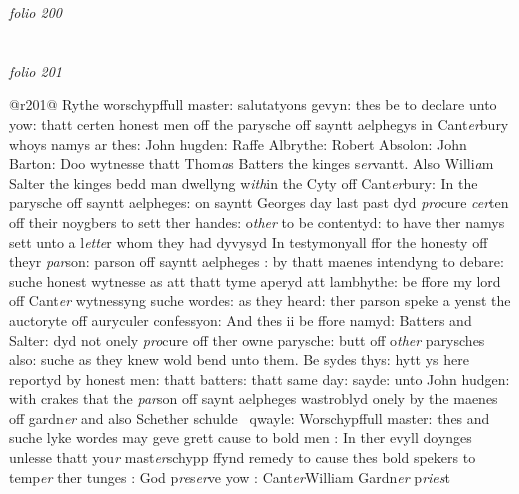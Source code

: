 \documentclass[12pt, a4paper]{book}
\begin{document}
\dotfill
					

\textit{folio 200}
      				
      				
      				\vspace{4cm}
      				
\dotfill
					  \section*{}

\textit{folio 201}
      				
      				
      				
      				@r201@
      				Rythe worschypffull master: salutatyons gevyn: thes be to declare unto yow: thatt certen honest men off the parysche off sayntt aelphegys in Cant\textit{er}bury whoys namys ar thes: John hugden: Raffe Albrythe: Robert Absolon: John Barton: Doo wytnesse thatt Thom\textit{a}s Batters the kinges s\textit{er}vantt. Also Willi\textit{a}m Salter the kinges bedd man dwellyng w\textit{ith}in the Cyty off Cant\textit{er}bury: In the parysche off sayntt aelpheges: on sayntt Georges day last past dyd \textit{pro}cure \textit{cer}ten off their noygbers to sett ther handes: o\textit{ther} to be contentyd: to have ther namys sett unto a l\textit{ette}r whom they had dyvysyd In testymonyall ffor the honesty off theyr \textit{par}son: parson off sayntt aelpheges : by thatt maenes intendyng to debare: suche honest wytnesse as att thatt tyme aperyd att lambhythe: be ffore my lord off Cant\textit{er} wytnessyng suche wordes: as they heard: ther parson speke a yenst the auctoryte off auryculer confessyon: And thes ii be ffore namyd: Batters and Salter: dyd not onely \textit{pro}cure off ther owne parysche: butt off o\textit{ther} parysches also: suche as they knew wold bend unto them. Be sydes thys: hytt ys here reportyd by honest men: thatt batters: thatt same day: sayde: unto John hudgen: with crakes that the \textit{par}son off saynt aelpheges wastroblyd onely by the maenes off gardn\textit{er} and also Schether schulde  qwayle: Worschypffull master: thes and suche lyke wordes may geve grett cause to bold men : In ther evyll doynges unlesse thatt you\textit{r} mast\textit{er}schypp ffynd remedy to cause thes bold spekers to temp\textit{er} ther tunges : God p\textit{re}s\textit{er}ve yow : Cant\textit{er}William Gardn\textit{er} p\textit{ries}t
      				
\dotfill
					
\end{document}
